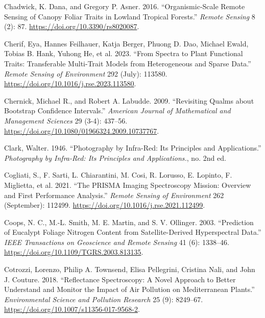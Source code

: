 \documentclass[
  letterpaper,
  DIV=11,
  numbers=noendperiod]{scrartcl}
\newlength{\cslhangindent}
\newlength{\cslentryspacingunit} %
\newenvironment{CSLReferences}[2] %
 {%
  \setlength{\parindent}{0pt}
  \ifodd #1
  \let\oldpar\par
  \def\par{\hangindent=\cslhangindent\oldpar}
  \fi
  \setlength{\parskip}{#2\cslentryspacingunit}
 }%
 {}
\begin{document}
\begin{CSLReferences}{1}{0}
\leavevmode{}%
Chadwick, K. Dana, and Gregory P. Asner. 2016. {``Organismic-Scale
Remote Sensing of Canopy Foliar Traits in Lowland Tropical Forests.''}
\emph{Remote Sensing} 8 (2): 87.
\url{https://doi.org/10.3390/rs8020087}.

\leavevmode{}%
Cherif, Eya, Hannes Feilhauer, Katja Berger, Phuong D. Dao, Michael
Ewald, Tobias B. Hank, Yuhong He, et al. 2023. {``From Spectra to Plant
Functional Traits: Transferable Multi-Trait Models from Heterogeneous
and Sparse Data.''} \emph{Remote Sensing of Environment} 292 (July):
113580. \url{https://doi.org/10.1016/j.rse.2023.113580}.

\leavevmode{}%
Chernick, Michael R., and Robert A. Labudde. 2009. {``Revisiting Qualms
about Bootstrap Confidence Intervals.''} \emph{American Journal of
Mathematical and Management Sciences} 29 (3-4): 437--56.
\url{https://doi.org/10.1080/01966324.2009.10737767}.

\leavevmode{}%
Clark, Walter. 1946. {``Photography by Infra-Red: Its Principles and
Applications.''} \emph{Photography by Infra-Red: Its Principles and
Applications.}, no. 2nd ed.

\leavevmode{}%
Cogliati, S., F. Sarti, L. Chiarantini, M. Cosi, R. Lorusso, E. Lopinto,
F. Miglietta, et al. 2021. {``The PRISMA Imaging Spectroscopy Mission:
Overview and First Performance Analysis.''} \emph{Remote Sensing of
Environment} 262 (September): 112499.
\url{https://doi.org/10.1016/j.rse.2021.112499}.

\leavevmode{}%
Coops, N. C., M.-L. Smith, M. E. Martin, and S. V. Ollinger. 2003.
{``Prediction of Eucalypt Foliage Nitrogen Content from
Satellite-Derived Hyperspectral Data.''} \emph{IEEE Transactions on
Geoscience and Remote Sensing} 41 (6): 1338--46.
\url{https://doi.org/10.1109/TGRS.2003.813135}.

\leavevmode{}%
Cotrozzi, Lorenzo, Philip A. Townsend, Elisa Pellegrini, Cristina Nali,
and John J. Couture. 2018. {``Reflectance Spectroscopy: A Novel Approach
to Better Understand and Monitor the Impact of Air Pollution on
Mediterranean Plants.''} \emph{Environmental Science and Pollution
Research} 25 (9): 8249--67.
\url{https://doi.org/10.1007/s11356-017-9568-2}.


\end{CSLReferences}
\end{document}
